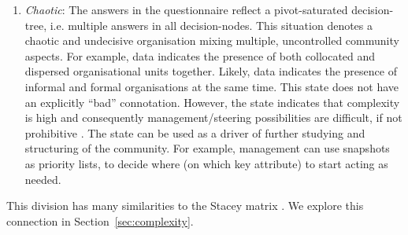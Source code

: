 \begin{enumerate}
\item \emph{Chaotic}: The answers in the questionnaire reflect a pivot-saturated decision-tree, i.e. multiple answers in all decision-nodes. This situation denotes a chaotic and undecisive organisation mixing multiple, uncontrolled community aspects. For example, data indicates the presence of both collocated and dispersed organisational units together. Likely, data indicates the presence of informal and formal organisations at the same time. This state does not have an explicitly ``bad'' connotation. However, the state indicates that complexity is high and consequently management/steering possibilities are difficult, if not prohibitive \cite{chaosorg}. The state can be used as a driver of further studying and structuring of the community. For example, management can use snapshots as priority lists, to decide where (on which key attribute) to start acting as needed.

%
\end{enumerate}

This division has many similarities to the Stacey matrix \cite{sta02aa}. We explore this connection in Section~\ref{sec:complexity}.

